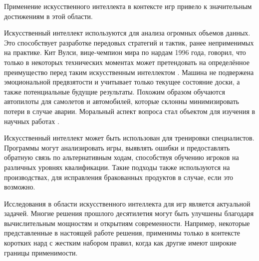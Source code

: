 Применение искусственного интеллекта в контексте игр привело к значительным достижениям в этой области.

Искусственный интеллект используются для анализа огромных объемов данных. Это способствует разработке передовых стратегий и тактик, ранее неприменимых на практике. Кит Вулси, вице-чемпион мира по нардам 1996 года, говорил, что только в некоторых технических моментах может претендовать на определённое преимущество перед таким искусственным интеллектом \cite{kitwoolsey}. Машина не подвержена эмоциональной предвзятости и учитывает только текущее состояние доски, а также потенциальные будущие результаты. Похожим образом обучаются автопилоты для самолетов и автомобилей, которые склонны минимизировать потери в случае аварии. Моральный аспект вопроса стал объектом для изучения в научных работах \cite{moralaspects}.

Искусственный интеллект может быть использован для тренировки специалистов. Программы могут анализировать игры, выявлять ошибки и предоставлять обратную связь по альтернативным ходам, способствуя обучению игроков на различных уровнях квалификации. Такие подходы также используются на производствах, для исправления бракованных продуктов в случае, если это возможно.

Исследования в области искусственного интеллекта для игр является актуальной задачей. Многие решения прошлого десятилетия могут быть улучшены благодаря вычислительным мощностям и открытиям современности. Например, некоторые представленные в настоящей работе решения, применимы только в контексте коротких нард с жестким набором правил, когда как другие имеют широкие границы применимости.
